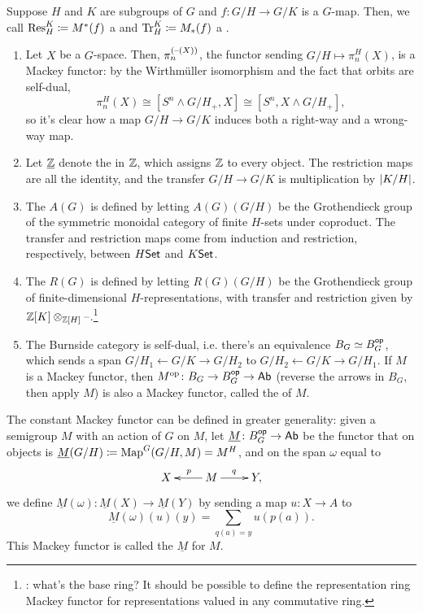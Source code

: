 Suppose $H$ and $K$ are subgroups of $G$ and $f\colon G/H\to G/K$ is a $G$-map. Then, we call $\operatorname{Res}_H^K\coloneqq
M^*(f)$ a  and $\operatorname{Tr}_H^K\coloneqq M_*(f)$ a
.
\begin{exm}\hfill
\label{Mackeyexm}
\begin{enumerate}
	\item Let $X$ be a $G$-space. Then, $\pi_n^{(\text{--}(X))}$, the functor sending $G/H\mapsto\pi_n^H(X)$, is a Mackey
	functor: by the Wirthmüller isomorphism and the fact that orbits are self-dual,
	\[\pi_n^H(X)\cong [S^n\wedge G/H_+, X]\cong [S^n, X\wedge G/H_+],\]
	so it's clear how a map $G/H\to G/K$ induces both a right-way and a wrong-way map.
	\item Let $\underline{\mathbb Z}$ denote the  in $\mathbb Z$, which assigns $\mathbb Z$ to every object.
	The restriction maps are all the identity, and the transfer $G/H\to G/K$ is multiplication by $\lvert K/H\rvert$.
	\item The  $A(G)$ is defined by letting $A(G)(G/H)$ be the Grothendieck group of
	the symmetric monoidal category of finite $H$-sets under coproduct. The transfer and restriction maps come from
	induction and restriction, respectively, between $H\mathsf{Set}$ and $K\mathsf{Set}$.
	\item The  $R(G)$ is defined by letting $R(G)(G/H)$ be the Grothendieck
	group of finite-dimensional $H$-representations, with transfer and restriction given by
	$\mathbb Z[K]\otimes_{\mathbb Z[H]}\text{--}$.\footnote{\TODO: what's the base ring? It should be possible to define the
	representation ring Mackey functor for representations valued in any commutative ring.}
	\item The Burnside category is self-dual, i.e. there's an equivalence $B_G\simeq B_G^{\mathsf{op}}$, which sends a span
	$G/H_1\gets G/K\to G/H_2$ to $G/H_2\gets G/K\to G/H_1$. If $M$ is a Mackey functor, then $M^{\mathrm{op}}\colon B_G\to
	B_G^{\mathsf{op}}\to\mathsf{Ab}$ (reverse the arrows in $B_G$, then apply $M$) is also a Mackey functor, called the
	 of $M$.
	\qedhere
\end{enumerate}
\end{exm}
\begin{exm}
The constant Mackey functor can be defined in greater generality: given a semigroup $M$ with an action of $G$ on
$M$, let $\underline M\colon B_G^{\mathsf{op}}\to\mathsf{Ab}$ be the functor that on objects is $\underline M(G/H)\coloneqq
\operatorname{Map}^G(G/H,M) = M^H$, and on the span $\omega$ equal to
	\[\xymatrix{
		X & M\ar[l]_p\ar[r]^q & Y,
	}\]
we define $\underline M(\omega)\colon \underline M(X) \to \underline M(Y)$ by sending a map $u\colon X \to A$ to
\[\underline M(\omega)(u)(y) = \sum_{q(a) = y} u(p(a)).\]
This Mackey functor is called the 
$\underline M$ for $M$.
\end{exm}
